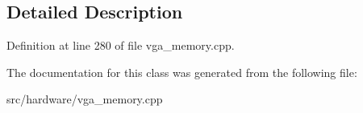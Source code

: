 \subsection{Detailed Description}


Definition at line 280 of file vga\-\_\-memory.\-cpp.



The documentation for this class was generated from the following file\-:\begin{DoxyCompactItemize}
\item 
src/hardware/vga\-\_\-memory.\-cpp\end{DoxyCompactItemize}
